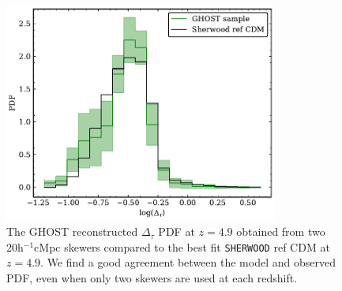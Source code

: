 \begin{figure}[ht!]
    \centering
    \includegraphics[width=0.8\textwidth]{img/ML/fit_ghost_z49.pdf}
    \caption{The GHOST reconstructed $\Delta_\tau$ PDF at $z=4.9$ obtained from two 20h$^{-1}$cMpc skewers compared to the best fit \texttt{SHERWOOD} ref CDM at $z=4.9$. We find a good agreement between the model and observed PDF, even when only two skewers are used at each redshift.}
    \label{fig: ghost fit}
\end{figure}

